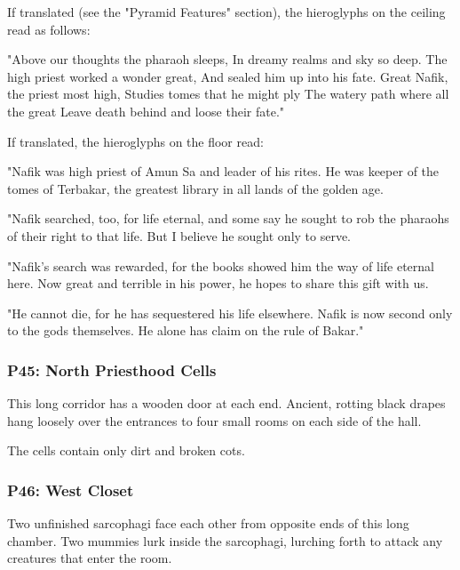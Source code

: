 \documentclass[10pt,a4paper,twoside,bg=print,twocolumn,openany,nodeprecatedcode]{dndbook}
\begin{document}
If translated (see the "Pyramid Features" section), the hieroglyphs on the ceiling read as follows:

\begin{DndReadAloud}{}
"Above our thoughts the pharaoh sleeps, In dreamy realms and sky so deep. The high priest worked a wonder great, And sealed him up into his fate. Great Nafik, the priest most high, Studies tomes that he might ply The watery path where all the great Leave death behind and loose their fate."

\end{DndReadAloud}

If translated, the hieroglyphs on the floor read:

\begin{DndReadAloud}{}
"Nafik was high priest of Amun Sa and leader of his rites. He was keeper of the tomes of Terbakar, the greatest library in all lands of the golden age.

"Nafik searched, too, for life eternal, and some say he sought to rob the pharaohs of their right to that life. But I believe he sought only to serve.

"Nafik's search was rewarded, for the books showed him the way of life eternal here. Now great and terrible in his power, he hopes to share this gift with us.

"He cannot die, for he has sequestered his life elsewhere. Nafik is now second only to the gods themselves. He alone has claim on the rule of Bakar."

\end{DndReadAloud}

\subsubsection{P45: North Priesthood Cells}
\begin{DndReadAloud}{}
This long corridor has a wooden door at each end. Ancient, rotting black drapes hang loosely over the entrances to four small rooms on each side of the hall.

\end{DndReadAloud}

The cells contain only dirt and broken cots.

\subsubsection{P46: West Closet}
Two unfinished sarcophagi face each other from opposite ends of this long chamber. Two mummies lurk inside the sarcophagi, lurching forth to attack any creatures that enter the room.
\end{document}
